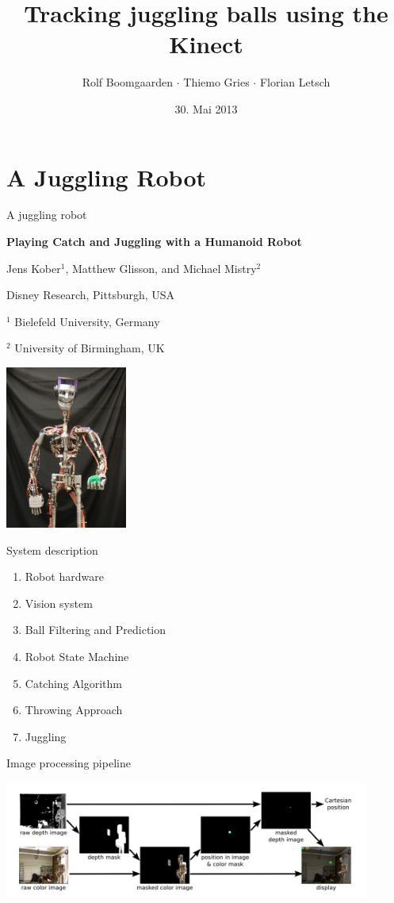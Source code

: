 \documentclass{beamer}
\title{Tracking juggling balls using the Kinect}
\author[Rolf $\cdot$ Thiemo $\cdot$ Flo]{Rolf Boomgaarden $\cdot$ Thiemo Gries $\cdot$ Florian Letsch}
\institute{Universität Hamburg}
\date{30. Mai 2013}
\begin{document}
\frame
{
\titlepage
}

\frame
{
\tableofcontents
}

\section{A Juggling Robot}

\begin{frame}{A juggling robot}

\textbf{Playing Catch and Juggling with a Humanoid Robot}

Jens Kober$^{1}$, Matthew Glisson, and Michael Mistry$^{2}$

Disney Research, Pittsburgh, USA

$^{1}$ Bielefeld University, Germany

$^{2}$ University of Birmingham, UK

\begin{center}\includegraphics[width=4cm]{img/robot.png}\end{center}
   
\end{frame}

\begin{frame}{System description}
\begin{enumerate}
\item Robot hardware
\item Vision system
\item Ball Filtering and Prediction
\item Robot State Machine
\item Catching Algorithm
\item Throwing Approach
\item Juggling
\end{enumerate}
\end{frame}

\begin{frame}{Image processing pipeline}
\begin{center}\includegraphics[width=12cm]{img/img-processing.png}\end{center}

\end{frame}
\end{document}
